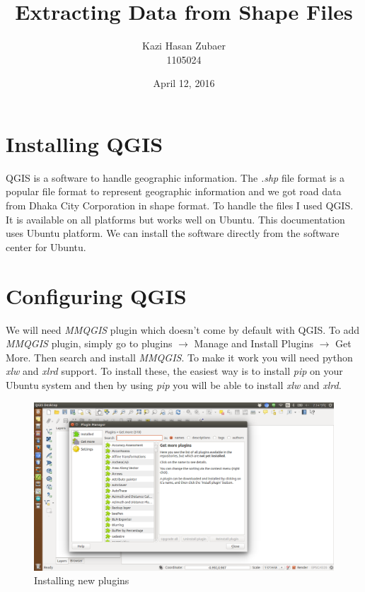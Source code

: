 \documentclass[12pt]{article}
\title{Extracting Data from Shape Files}
\author{Kazi Hasan Zubaer \\ 1105024}
\date{April 12, 2016}
\begin{document}
\maketitle
\section*{Installing QGIS}
QGIS is a software to handle geographic information. The \textit{.shp} file format is a popular file format to represent geographic information and we got road data from Dhaka City Corporation in shape format. To handle the files I used QGIS. It is available on all platforms but works well on Ubuntu. This documentation uses Ubuntu platform. We can install the software directly from the software center for Ubuntu.

\section*{Configuring QGIS}
We will need \textit{MMQGIS} plugin which doesn't come by default with QGIS. To add \textit{MMQGIS} plugin, simply go to plugins $ \rightarrow $ Manage and Install Plugins $ \rightarrow $ Get More. Then search and install \textit{MMQGIS}. To make it work you will need python \textit{xlw} and \textit{xlrd} support. To install these, the easiest way is to install \textit{pip} on your Ubuntu system and then by using \textit{pip} you will be able to install \textit{xlw} and \textit{xlrd}. \\
\begin{figure}
\centering
\includegraphics[scale=.25]{qgis01.png}
\caption{Installing new plugins}
\end{figure}
\end{document}
